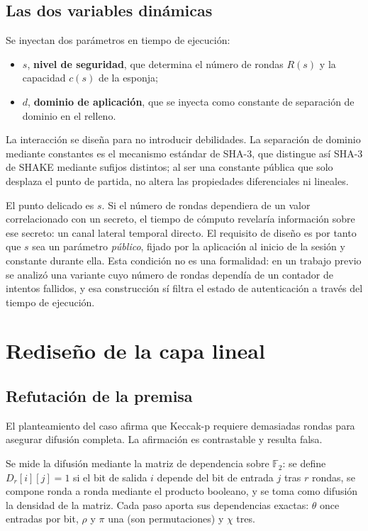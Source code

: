 \documentclass[conference]{IEEEtran}
\newcommand{\Fdos}{\mathbb{F}_2}
\begin{document}
\subsection{Las dos variables dinámicas}

Se inyectan dos parámetros en tiempo de ejecución:
\begin{itemize}
\item $s$, \textbf{nivel de seguridad}, que determina el número de rondas $R(s)$ y
la capacidad $c(s)$ de la esponja;
\item $d$, \textbf{dominio de aplicación}, que se inyecta como constante de
separación de dominio en el relleno.
\end{itemize}

La interacción se diseña para no introducir debilidades. La separación de dominio
mediante constantes es el mecanismo estándar de SHA-3, que distingue así SHA-3 de
SHAKE mediante sufijos distintos; al ser una constante pública que solo desplaza
el punto de partida, no altera las propiedades diferenciales ni lineales.

El punto delicado es $s$. Si el número de rondas dependiera de un valor
correlacionado con un secreto, el tiempo de cómputo revelaría información sobre
ese secreto: un canal lateral temporal directo. El requisito de diseño es por
tanto que $s$ sea un parámetro \emph{público}, fijado por la aplicación al inicio
de la sesión y constante durante ella. Esta condición no es una formalidad: en un
trabajo previo se analizó una variante cuyo número de rondas dependía de un
contador de intentos fallidos, y esa construcción sí filtra el estado de
autenticación a través del tiempo de ejecución.

\section{Rediseño de la capa lineal}

\subsection{Refutación de la premisa}

El planteamiento del caso afirma que Keccak-p requiere demasiadas rondas para
asegurar difusión completa. La afirmación es contrastable y resulta falsa.

Se mide la difusión mediante la matriz de dependencia sobre $\Fdos$: se define
$D_r[i][j] = 1$ si el bit de salida $i$ depende del bit de entrada $j$ tras $r$
rondas, se compone ronda a ronda mediante el producto booleano, y se toma como
difusión la densidad de la matriz. Cada paso aporta sus dependencias exactas:
$\theta$ once entradas por bit, $\rho$ y $\pi$ una (son permutaciones) y $\chi$
tres.
\end{document}
